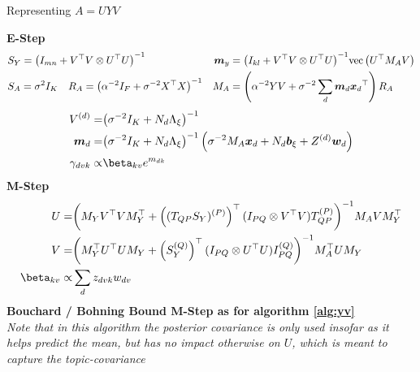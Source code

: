 \begin{algorithm}
\caption{Representing $A=UYV$}
\label{alg:uyv}
$\text{ }$\\
{\bf E-Step}
    \begin{align*}
        & S_Y = {\left( I_{mn} + V^\top V \otimes U^\top U \right)}^{-1} \quad &
\bm m_y & = {\left( I_{kl} + V^\top V \otimes U^\top U \right)}^{-1} \text{vec}\left(U^\top M_A V\right) \\
        & S_A = \sigma^2 I_K \quad R_A = {\left( \alpha^{-2} I_F + \sigma^{-2} X^\top X \right)}^{-1} 
        & M_A & = \left(\alpha^{-2} YV + \sigma^{-2} \sum_d \bm m_d { \bm x_d }^\top\right)R_A
    \end{align*}
    \begin{align*}
         \Vd = & \invb{\sigma^{-2}I_K + N_d \Axi}\\
         \md = & \invb{\sigma^{-2}I_K + N_d \Axi} \left(\sigma^{-2} M_A \xd  + N_d \bxi + Z^{(d)}\vv{w}_d \right )\\
        \gamma_{dvk} \propto & \beta_{kv} e^{m_{dk}} 
\end{align*}
{\bf M-Step}
\begin{align*}
    U = & \invb{\mmy V\T V \mmy\T + \left( \vt{(T_{QP} S_Y)}{P} \right)\T (I_{PQ} \otimes V\T V)\vt{T_{QP}}{P}} M_A V \mmy\T \\
    V = & \invb{\mmy\T U\T U \mmy + \left(\vt{S_Y}{Q}\right)\T (I_{PQ} \otimes U\T U) \vt{I_{PQ}}{Q} } M_A \T U \mmy \\
    \beta_{kv} \propto & \sum_d z_{dvk} w_{dv} 
\end{align*}
{\bf Bouchard / Bohning Bound M-Step as for algorithm \ref{alg:yv}}\\
{\emph {Note that in this algorithm the posterior covariance is only used insofar as it helps predict the mean, but has no impact otherwise on $U$, which is meant to capture the topic-covariance}}
\end{algorithm}


%



